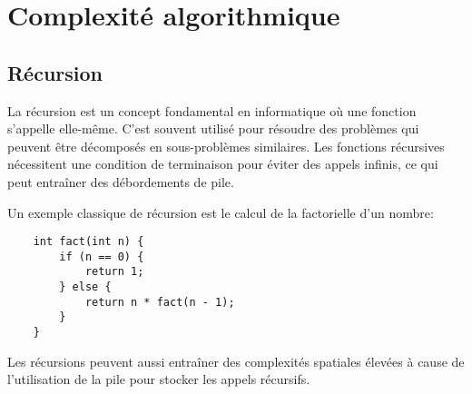 %


\chapter{Complexité algorithmique}

\section{Récursion}
La récursion est un concept fondamental en informatique où une fonction s'appelle elle-même. C'est souvent utilisé pour résoudre des problèmes qui peuvent être décomposés en sous-problèmes similaires. Les fonctions récursives nécessitent une condition de terminaison pour éviter des appels infinis, ce qui peut entraîner des débordements de pile.

Un exemple classique de récursion est le calcul de la factorielle d'un nombre:

\begin{lstlisting}
	int fact(int n) {
		if (n == 0) {
			return 1;
		} else {
			return n * fact(n - 1);
		}
	}
\end{lstlisting}

Les récursions peuvent aussi entraîner des complexités spatiales élevées à cause de l'utilisation de la pile pour stocker les appels récursifs. 

